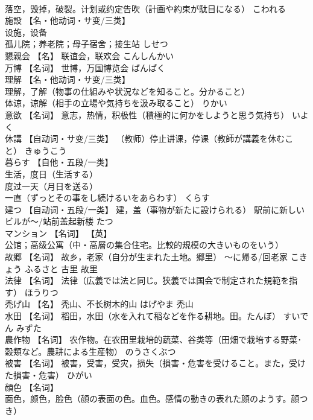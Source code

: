 \documentclass[8pt]{extreport}
\begin{document}
\begin{CJK}{UTF8}{min}
\\	落空，毁掉，破裂。计划或约定告吹（計画や約束が駄目になる）	こわれる	
\\	施設	【名・他动词・サ变/三类】 
\\	设施，设备 
\\	孤儿院；养老院；母子宿舍；接生站	しせつ	
\\	懇親会	【名】 联谊会，联欢会	こんしんかい	
\\	万博	【名词】 世博，万国博览会	ばんぱく	
\\	理解	【名・他动词・サ变/三类】 
\\	理解，了解（物事の仕組みや状況などを知ること。分かること） 
\\	体谅，谅解（相手の立場や気持ちを汲み取ること）	りかい	
\\	意欲	【名词】 意志，热情，积极性（積極的に何かをしようと思う気持ち）	いよく	
\\	休講	【自动词・サ变/三类】 （教师）停止讲课，停课（教師が講義を休むこと）	きゅうこう	
\\	暮らす	【自他・五段/一类】 
\\	生活，度日（生活する） 
\\	度过一天（月日を送る） 
\\	一直（ずっとその事をし続けるいをあらわす）	くらす	
\\	建つ	【自动词・五段/一类】 建，盖（事物が新たに設けられる） 駅前に新しいビルが〜/站前盖起新楼	たつ	
\\	マンション	【名词】 【英】
\\	公馆；高级公寓（中・高層の集合住宅。比較的規模の大きいものをいう）		
\\	故郷	【名词】 故乡，老家（自分が生まれた土地。郷里） 〜に帰る/回老家	こきょう ふるさと	古里 故里
\\	法律	【名词】 法律（広義では法と同じ。狭義では国会で制定された規範を指す）	ほうりつ	
\\	禿げ山	【名】 秃山、不长树木的山	はげやま	禿山
\\	水田	【名词】 稻田，水田（水を入れて稲などを作る耕地。田。たんぼ）	すいでん みずた	
\\	農作物	【名词】 农作物。在农田里栽培的蔬菜、谷类等（田畑で栽培する野菜･穀類など。農耕による生産物）	のうさくぶつ	
\\	被害	【名词】 被害，受害，受灾，损失（損害・危害を受けること。また，受けた損害・危害）	ひがい	
\\	顔色	【名词】 
\\	面色，颜色，脸色（顔の表面の色。血色。感情の動きの表れた顔のようす。顔つき） 

\end{CJK}
\end{document}
